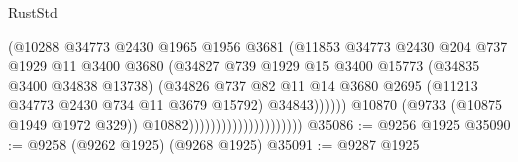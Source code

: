 \begin{lexlean}{RustStd}
\begin{coremodule}
                                                  (@10288
                                                    @34773
                                                    @2430
                                                    @1965
                                                    @1956
                                                    @3681
                                                    (@11853
                                                      @34773
                                                      @2430
                                                      @204
                                                      @737
                                                      @1929
                                                      @11
                                                      @3400
                                                      @3680
                                                      (@34827
                                                        @739
                                                        @1929
                                                        @15
                                                        @3400
                                                        @15773
                                                        (@34835 @3400 @34838 @13738)
                                                        (@34826
                                                          @737
                                                          @82
                                                          @11
                                                          @14
                                                          @3680
                                                          @2695
                                                          (@11213
                                                            @34773
                                                            @2430
                                                            @734
                                                            @11
                                                            @3679
                                                            @15792)
                                                          @34843))))))
                                              @10870
                                              (@9733 (@10875 @1949 @1972 @329))
                                              @10882)))))))))))))))))))))
@35086 := @9256 @1925
@35090 := @9258 (@9262 @1925) (@9268 @1925)
@35091 := @9287 @1925

\end{coremodule}
\end{lexlean}
